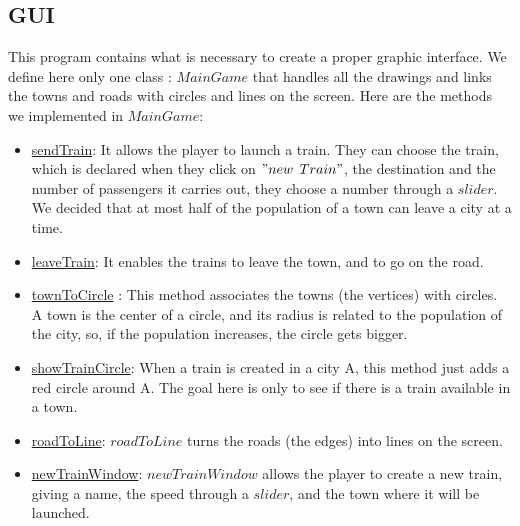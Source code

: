 \documentclass[a4paper]{article}
\begin{document}
	\subsection{GUI}
	This program contains what is necessary to create a proper graphic interface. We define here only one class : $MainGame$ that handles all the drawings and links the towns and roads with circles and lines on the screen.
	Here are the methods we implemented in $MainGame$:
	\begin{itemize}
		\item \underline{sendTrain}: It allows the player to launch a train. They can choose the train, which is declared when they click on $"new$ $Train"$, the destination and the number of passengers it carries out, they choose a number through a $slider$. We decided that at most half of the population of a town can leave a city at a time.  
		
		\item \underline{leaveTrain}: It enables the trains to leave the town, and to go on the road.
		
		\item \underline{townToCircle} : This method associates the towns (the vertices) with circles. A town is the center of a circle, and its radius is related to the population of the city, so, if the population increases, the circle gets bigger.
		
		\item \underline{showTrainCircle}: When a train is created in a city A, this method just adds a red circle around A. The goal here is only to see if there is a train available in a town.
		
		\item \underline{roadToLine}: $roadToLine$ turns  the roads (the edges) into lines on the screen.
		
		\item \underline{newTrainWindow}: $newTrainWindow$ allows the player to create a new train, giving a name, the speed through a $slider$, and the town where it will be launched.
		
	\end{itemize}
	
\end{document}
